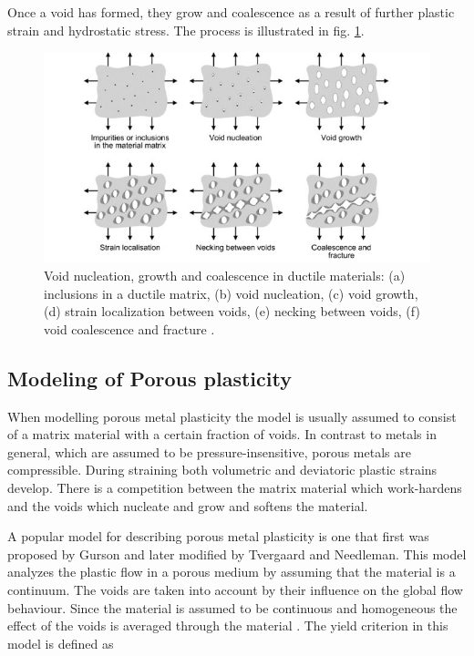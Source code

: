\documentclass{article}
\begin{document}
Once a void has formed, they grow and coalescence as a result of further plastic strain and hydrostatic stress. The process is illustrated in fig. \ref{fig:Voidnucleation}.

\begin{figure}[h!]
    \includegraphics[width=\linewidth]{Voidnucleation.jpg}
    \caption{Void nucleation, growth and coalescence in ductile materials: (a) inclusions in a ductile matrix, (b) void nucleation, (c) void growth, (d) strain localization between voids, (e) necking between voids, (f) void coalescence and fracture \cite{FractureMechanics}.}
    \label{fig:Voidnucleation}

\end{figure}
\subsection{Modeling of Porous plasticity}
When modelling porous metal plasticity the model is usually assumed to consist of a matrix material with a certain fraction of voids. In contrast to metals in general, which are assumed to be pressure-insensitive, porous metals are compressible. During straining both volumetric and deviatoric plastic strains develop. There is a competition between the matrix material which work-hardens and the voids which nucleate and grow and softens the material. 

A popular model for describing porous metal plasticity is one that first was proposed by Gurson and later modified by Tvergaard and Needleman. This model analyzes the plastic flow in a porous medium by assuming that the material is a continuum. The voids are taken into account by their influence on the global flow behaviour. Since the material is assumed to be continuous and homogeneous the effect of the voids is averaged through the material \cite{FractureMechanics}. The yield criterion in this model is defined as
\end{document}
